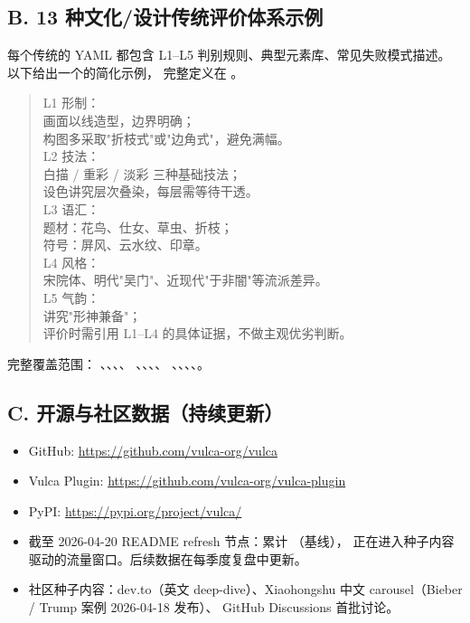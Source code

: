 \subsection*{B. 13 种文化/设计传统评价体系示例}

每个传统的 YAML 都包含 L1–L5 判别规则、典型元素库、常见失败模式描述。
以下给出一个的简化示例，
完整定义在 。

\begin{quote}
\small\ttfamily
L1 形制：\\
\quad 画面以线造型，边界明确；\\
\quad 构图多采取"折枝式"或"边角式"，避免满幅。\\
L2 技法：\\
\quad 白描 / 重彩 / 淡彩 三种基础技法；\\
\quad 设色讲究层次叠染，每层需等待干透。\\
L3 语汇：\\
\quad 题材：花鸟、仕女、草虫、折枝；\\
\quad 符号：屏风、云水纹、印章。\\
L4 风格：\\
\quad 宋院体、明代"吴门"、近现代"于非闇"等流派差异。\\
L5 气韵：\\
\quad 讲究"形神兼备"；\\
\quad 评价时需引用 L1–L4 的具体证据，不做主观优劣判断。
\end{quote}

完整覆盖范围：
、、、、
、、、、
、、、、。

\subsection*{C. 开源与社区数据（持续更新）}

\begin{itemize}
  \item GitHub: \url{https://github.com/vulca-org/vulca}
  \item Vulca Plugin: \url{https://github.com/vulca-org/vulca-plugin}
  \item PyPI: \url{https://pypi.org/project/vulca/}
  \item 截至 2026-04-20 README refresh 节点：累计 （基线），
  正在进入种子内容驱动的流量窗口。后续数据在每季度复盘中更新。
  \item 社区种子内容：dev.to（英文 deep-dive）、Xiaohongshu 中文 carousel（Bieber / Trump 案例 2026-04-18 发布）、
  GitHub Discussions 首批讨论。
\end{itemize}

